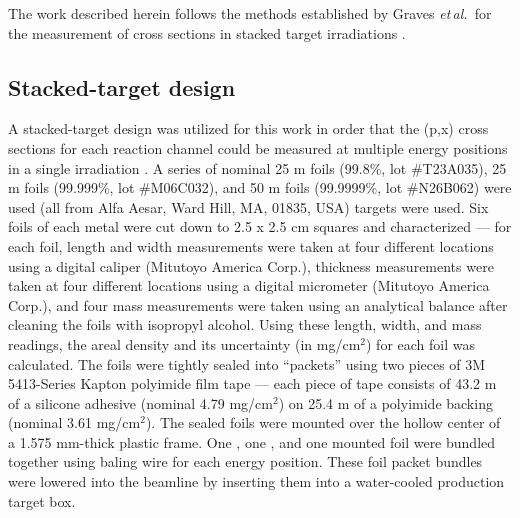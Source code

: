 \documentclass[3p]{elsarticle}
\newcommand{\comment}[1]{\todo[color=blue!20!white,inline]{ASV: #1}}
\newcommand{\etal}{\emph{et\,al.}}
\begin{document}
The work described herein follows the  methods established by Graves \etal\ for the measurement of cross sections in stacked target irradiations   \cite{Graves2016}.



\subsection{Stacked-target design }\label{sec:target_design}


A stacked-target design was utilized for this work in order that the (p,x) cross sections for each reaction channel could be measured at multiple energy positions in a single irradiation \cite{Cumming1963}. 
A series of nominal 25 \micro m  foils (99.8\%, lot \#T23A035), 25 \micro m  foils (99.999\%, lot \#M06C032), and 50 \micro m  foils (99.9999\%, lot \#N26B062) were used (all from Alfa Aesar, Ward Hill, MA, 01835, USA) targets were used.
Six foils of each metal were cut down to 2.5 x 2.5 cm squares and characterized --- for each foil, length and width measurements were taken at four different locations using a digital caliper (Mitutoyo America Corp.), thickness measurements were taken at four different locations using a digital micrometer (Mitutoyo America Corp.), and four mass measurements were taken using an analytical balance after cleaning the foils with isopropyl alcohol.
Using these length, width, and mass readings, the areal density and its uncertainty (in mg/cm$^2$) for each foil was calculated.
The foils were tightly sealed into \enquote{packets} using two pieces of  3M 5413-Series Kapton polyimide film tape --- each piece of tape consists of 43.2 \micro m of a silicone adhesive (nominal 4.79 mg/cm$^2$) on 25.4 \micro m of a polyimide backing (nominal 3.61 mg/cm$^2$).
The sealed foils were mounted over the hollow center of a 1.575 mm-thick plastic frame.
One , one , and one  mounted foil were bundled together using baling wire for each energy position.
These foil packet bundles were lowered into the beamline by inserting them into a  water-cooled production target box.
\end{document}
